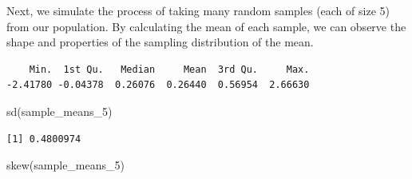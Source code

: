 \documentclass[
  letterpaper,
  DIV=11,
  numbers=noendperiod]{scrreprt}
\newenvironment{Shaded}{\begin{snugshade}}{\end{snugshade}}
\newcommand{\AttributeTok}[1]{\textcolor[rgb]{0.40,0.45,0.13}{#1}}
\newcommand{\CommentTok}[1]{\textcolor[rgb]{0.37,0.37,0.37}{#1}}
\newcommand{\ConstantTok}[1]{\textcolor[rgb]{0.56,0.35,0.01}{#1}}
\newcommand{\ControlFlowTok}[1]{\textcolor[rgb]{0.00,0.23,0.31}{\textbf{#1}}}
\newcommand{\DecValTok}[1]{\textcolor[rgb]{0.68,0.00,0.00}{#1}}
\newcommand{\FunctionTok}[1]{\textcolor[rgb]{0.28,0.35,0.67}{#1}}
\newcommand{\NormalTok}[1]{\textcolor[rgb]{0.00,0.23,0.31}{#1}}
\newcommand{\OtherTok}[1]{\textcolor[rgb]{0.00,0.23,0.31}{#1}}
\newcommand{\SpecialCharTok}[1]{\textcolor[rgb]{0.37,0.37,0.37}{#1}}
\begin{document}
Next, we simulate the process of taking many random samples (each of
size 5) from our population. By calculating the mean of each sample, we
can observe the shape and properties of the sampling distribution of the
mean.

\begin{Shaded}
\end{Shaded}

\begin{verbatim}
    Min.  1st Qu.   Median     Mean  3rd Qu.     Max. 
-2.41780 -0.04378  0.26076  0.26440  0.56954  2.66630 
\end{verbatim}

\begin{Shaded}
\begin{Highlighting}[]
\FunctionTok{sd}\NormalTok{(sample\_means\_5) }
\end{Highlighting}
\end{Shaded}

\begin{verbatim}
[1] 0.4800974
\end{verbatim}

\begin{Shaded}
\begin{Highlighting}[]
\FunctionTok{skew}\NormalTok{(sample\_means\_5) }
\end{Highlighting}
\end{Shaded}
\end{document}
